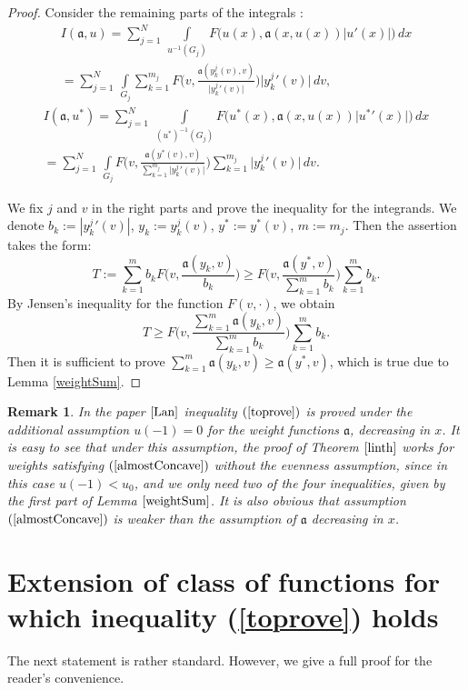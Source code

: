 \documentclass[12pt]{article}
\newcommand{\abs}[1]{\left\vert#1\right\vert}
\newcommand{\bigabs}[1]{\bigl\vert#1\bigr\vert}
\renewcommand{\ge}{\geqslant}
\newtheorem{rem}{Remark}
\begin{document}
\begin{proof}
Consider the remaining parts of the integrals :
\begin{multline*}
I(\mathfrak a, u) = \sum_{j=1}^N \,\int\limits_{u^{-1}(G_j)} F\big(u(x), \mathfrak a(x, u(x)) \abs{u'(x)}\big) \, dx
\\ = \sum_{j=1}^N \,\int\limits_{G_j} \sum_{k=1}^{m_j} F\Big(v, \frac{\mathfrak a(y_k^j(v), v)}{\bigabs{y_k^j{}'(v)}}\Big) \bigabs{y_k^j{}'(v)} \, dv,
\end{multline*}
\begin{multline*}
I(\mathfrak a, u^*) = \sum_{j=1}^N \,\int\limits_{(u^*)^{-1}(G_j)} F\big(u^*(x), \mathfrak a(x, u(x)) \bigabs{u^*{}'(x)}\big) \, dx
\\ = \sum_{j=1}^N \,\int\limits_{G_j} F\Big(v, \frac{\mathfrak a(y^*(v), v)}{\sum_{k=1}^{m_j} \bigabs{y_k^j{}'(v)}}\Big)
\sum_{k=1}^{m_j} \bigabs{ y_k^j{}'(v) } \, dv.
\end{multline*}

We fix $j$ and $v$ in the right parts and prove the inequality for the integrands.
We denote $b_k := |y_k^j{}'(v)|$, $y_k := y_k^j(v)$, $y^* := y^*(v)$, $m := m_j$.
Then the assertion takes the form:
$$T:=\sum_{k=1}^m b_k F\Big( v, \frac{ \mathfrak a(y_k, v) }{b_k} \Big)
\ge F\Big( v, \frac{ \mathfrak a(y^*, v) }{ \sum_{k=1}^m b_k  } \Big) \sum_{k=1}^m b_k.$$
By Jensen's inequality for the function $F(v, \cdot)$, we obtain
$$T \ge F\Big( v, \frac{ \sum_{k=1}^m \mathfrak a(y_k, v) }{ \sum_{k=1}^m b_k } \Big) \sum_{k=1}^m b_k.$$
Then it is sufficient to prove $\sum_{k=1}^m \mathfrak a(y_k, v) \ge \mathfrak a(y^*, v)$, which is true due to Lemma \ref{weightSum}.
\end{proof}

\begin{rem}
\label{landesLinear}
In the paper $\cite{Lan}$ inequality $(\ref{toprove})$ is proved under the additional assumption $u(-1) = 0$
for the weight functions $\mathfrak a$, decreasing in $x$.
It is easy to see that under this assumption, the proof of Theorem $\ref{linth}$ works for weights satisfying
$(\ref{almostConcave})$ without the evenness assumption,
since in this case $u(-1) < u_0$, and we only need two of the four inequalities,
given by the first part of Lemma $\ref{weightSum}$.
It is also obvious that assumption $(\ref{almostConcave})$ is weaker than the assumption of $\mathfrak a$ decreasing in $x$.
\end{rem}


\section{Extension of class of functions for which inequality (\ref{toprove}) holds}
The next statement is rather standard. However, we give a full proof for the reader's convenience.
\end{document}
